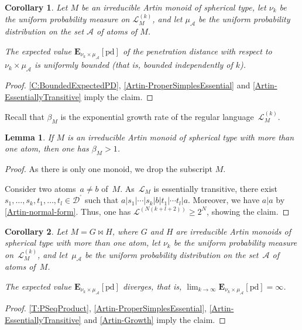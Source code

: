 \documentclass[a4paper,final]{article}
\let\ge\geqslant
\let\zs=\bowtie
\theoremstyle{plain}
\newtheorem{lemma}[lemma]{Lemma}
\newtheorem{corollary}[corollary]{Corollary}
\theoremstyle{remark}
\theoremstyle{definition}
\begin{document}
\begin{corollary}\label{C:BoundedExpectedPD-Artin}
Let $M$ be an irreducible Artin monoid of spherical type, let $\nu_{k}$ be the uniform probability measure on ${\mathcal{L}}_M^{(k)}$, and let $\mu_{\mathcal{A}}$ be the uniform probability distribution on the set ${\mathcal{A}}$ of atoms of $M$.

The expected value $\mathbf{E}_{\nu_{k} \times \mu_{\mathcal{A}}}[{\mathrm{pd}}]$ of the penetration distance with respect to $\nu_k\times \mu_{\mathcal{A}}$ is uniformly bounded (that is, bounded independently of $k$).
\end{corollary}
\begin{proof}
\autoref{C:BoundedExpectedPD}, \autoref{Artin-ProperSimplesEssential} and \autoref{Artin-EssentiallyTransitive} imply the claim.
\end{proof}

Recall that $\beta_M$ is the exponential growth rate of the regular language~${\mathcal{L}}_M^{(k)}$.

\begin{lemma}\label{Artin-Growth}
If $M$ is an irreducible Artin monoid of spherical type with more than one atom, then one has $\beta_M>1$.
\end{lemma}
\begin{proof}
As there is only one monoid, we drop the subscript $M$.

Consider two atoms~$a\neq b$ of~$M$.  As~${\mathcal{L}}_M$ is essentially transitive, there exist $s_1,\ldots,s_k,t_1,\ldots,t_l\in{{\mathcal{D}}^{\!{}^{\circ}\!}}$ such that $a|s_1|\cdots|s_k|b|t_1|\cdots t_l|a$.  Moreover, we have $a|a$ by \autoref{Artin-normal-form}.
Thus, one has ${\mathcal{L}}^{\left(N(k+l+2)\right)} \ge 2^N$, showing the claim.
\end{proof}

\begin{corollary}\label{C:UnboundedExpectedPD-ZappaSzep-Artin}
Let $M=G\zs H$, where $G$ and $H$ are irreducible Artin monoids of spherical type with more than one atom, let $\nu_{k}$ be the uniform probability measure on~${\mathcal{L}}_M^{(k)}$, and let~$\mu_{\mathcal{A}}$ be the uniform probability distribution on the set~${\mathcal{A}}$ of atoms of~$M$.

The expected value
$\mathbf{E}_{\nu_{k} \times \mu_{\mathcal{A}}}[{\mathrm{pd}}]$ diverges, that is, $\lim_{k\to\infty} \mathbf{E}_{\nu_{k} \times \mu_{\mathcal{A}}}[{\mathrm{pd}}] = \infty$.
\end{corollary}
\begin{proof}
\autoref{T:PSeqProduct}, \autoref{Artin-ProperSimplesEssential}, \autoref{Artin-EssentiallyTransitive} and \autoref{Artin-Growth} imply the claim.
\end{proof}
\end{document}

